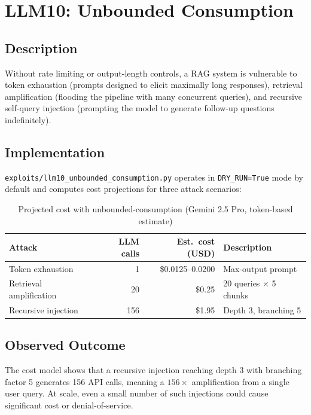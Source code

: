 \documentclass[12pt, a4paper]{report}
\begin{document}
\section{LLM10: Unbounded Consumption}

\subsection{Description}

Without rate limiting or output-length controls, a RAG system is vulnerable to token
exhaustion (prompts designed to elicit maximally long responses), retrieval amplification
(flooding the pipeline with many concurrent queries), and recursive self-query injection
(prompting the model to generate follow-up questions indefinitely).

\subsection{Implementation}

\texttt{exploits/llm10\_unbounded\_consumption.py} operates in \texttt{DRY\_RUN=True} mode by
default and computes cost projections for three attack scenarios:
\medskip
\begin{table}[H]
      \centering
      \begin{tabular}{lrrl}
            \toprule
            \textbf{Attack}         & \textbf{LLM calls} & \textbf{Est.\ cost (USD)} & \textbf{Description}         \\
            \midrule
            Token exhaustion        & 1                  & \$0.0125--0.0200          & Max-output prompt            \\
            Retrieval amplification & 20                 & \$0.25                    & 20 queries $\times$ 5 chunks \\
            Recursive injection     & 156                & \$1.95                    & Depth 3, branching 5         \\
            \bottomrule
      \end{tabular}
      \caption{Projected cost with unbounded-consumption (Gemini 2.5 Pro, token-based estimate)}
\end{table}

\subsection{Observed Outcome}

The cost model shows that a recursive injection reaching depth 3 with branching factor 5
generates 156 API calls, meaning a $156\times$ amplification from a single user query. At scale, even a small number of such injections could cause significant cost or denial-of-service.
\end{document}
